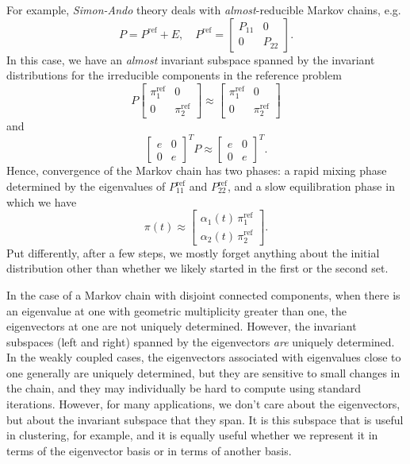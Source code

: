 \documentclass[12pt, leqno]{article} %
\begin{document}
For example, {\em Simon-Ando} theory deals
with {\em almost}-reducible Markov chains, e.g.
\[
  P = P^{\mathrm{ref}} + E, \quad
  P^{\mathrm{ref}} = \begin{bmatrix} P_{11} & 0 \\ 0 & P_{22} \end{bmatrix}.
\]
In this case, we have an {\em almost} invariant subspace spanned
by the invariant distributions for the irreducible components in the
reference problem
\[
  P \begin{bmatrix} \pi_1^{\mathrm{ref}} & 0 \\ 0 &
                    \pi_2^{\mathrm{ref}} \end{bmatrix}
  \approx
  \begin{bmatrix} \pi_1^{\mathrm{ref}} & 0 \\ 0 &
                  \pi_2^{\mathrm{ref}} \end{bmatrix}
\]
and
\[
  \begin{bmatrix} e & 0 \\ 0 & e \end{bmatrix}^T P \approx
  \begin{bmatrix} e & 0 \\ 0 & e \end{bmatrix}^T.
\]
Hence, convergence of the Markov chain has two phases: a rapid mixing
phase determined by the eigenvalues of $P_{11}^{\mathrm{ref}}$
and $P_{22}^{\mathrm{ref}}$, and a slow equilibration phase in which
we have
\[
  \pi(t) \approx
  \begin{bmatrix}
    \alpha_1(t) \, \pi_1^{\mathrm{ref}} \\
    \alpha_2(t) \, \pi_2^{\mathrm{ref}}
  \end{bmatrix}.
\]
Put differently, after a few steps, we mostly forget anything about
the initial distribution other than whether we likely started in the
first or the second set.

In the case of a Markov chain with disjoint connected components, when
there is an eigenvalue at one with geometric multiplicity greater than
one, the eigenvectors at one are not uniquely determined.  However,
the invariant subspaces (left and right) spanned by the eigenvectors
{\em are} uniquely determined.  In the weakly coupled cases, the
eigenvectors associated with eigenvalues close to one generally are
uniquely determined, but they are sensitive to small changes in the
chain, and they may individually be hard to compute using standard
iterations.  However, for many applications, we don't care about the
eigenvectors, but about the invariant subspace that they span.  It is
this subspace that is useful in clustering, for example, and it is
equally useful whether we represent it in terms of the eigenvector
basis or in terms of another basis.
\end{document}
